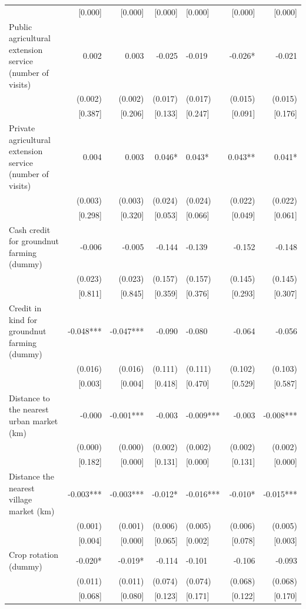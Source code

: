 \documentclass[
]{article}
\begin{document}
\begin{landscape}
\begin{ThreePartTable}
\begin{longtable}[t]{lrrrlrr}
 & {}[0.000] & {}[0.000] & {}[0.000] & {}[0.000] & {}[0.000] & {}[0.000]\\
Public agricultural extension service (number of visits) & 0.002 & 0.003 & -0.025 & -0.019 & -0.026* & -0.021\\
 & (0.002) & (0.002) & (0.017) & (0.017) & (0.015) & (0.015)\\
 & {}[0.387] & {}[0.206] & {}[0.133] & {}[0.247] & {}[0.091] & {}[0.176]\\
Private agricultural extension service (number of visits) & 0.004 & 0.003 & 0.046* & 0.043* & 0.043** & 0.041*\\
 & (0.003) & (0.003) & (0.024) & (0.024) & (0.022) & (0.022)\\
 & {}[0.298] & {}[0.320] & {}[0.053] & {}[0.066] & {}[0.049] & {}[0.061]\\
Cash credit for groundnut farming (dummy) & -0.006 & -0.005 & -0.144 & -0.139 & -0.152 & -0.148\\
 & (0.023) & (0.023) & (0.157) & (0.157) & (0.145) & (0.145)\\
 & {}[0.811] & {}[0.845] & {}[0.359] & {}[0.376] & {}[0.293] & {}[0.307]\\
Credit in kind for groundnut farming (dummy) & -0.048*** & -0.047*** & -0.090 & -0.080 & -0.064 & -0.056\\
 & (0.016) & (0.016) & (0.111) & (0.111) & (0.102) & (0.103)\\
 & {}[0.003] & {}[0.004] & {}[0.418] & {}[0.470] & {}[0.529] & {}[0.587]\\
Distance to the nearest urban market (km) & -0.000 & -0.001*** & -0.003 & -0.009*** & -0.003 & -0.008***\\
 & (0.000) & (0.000) & (0.002) & (0.002) & (0.002) & (0.002)\\
 & {}[0.182] & {}[0.000] & {}[0.131] & {}[0.000] & {}[0.131] & {}[0.000]\\
Distance the nearest village market (km) & -0.003*** & -0.003*** & -0.012* & -0.016*** & -0.010* & -0.015***\\
 & (0.001) & (0.001) & (0.006) & (0.005) & (0.006) & (0.005)\\
 & {}[0.004] & {}[0.000] & {}[0.065] & {}[0.002] & {}[0.078] & {}[0.003]\\
Crop rotation (dummy) & -0.020* & -0.019* & -0.114 & -0.101 & -0.106 & -0.093\\
 & (0.011) & (0.011) & (0.074) & (0.074) & (0.068) & (0.068)\\
 & {}[0.068] & {}[0.080] & {}[0.123] & {}[0.171] & {}[0.122] & {}[0.170]\\

\end{longtable}
\end{ThreePartTable}
\end{landscape}
\end{document}
